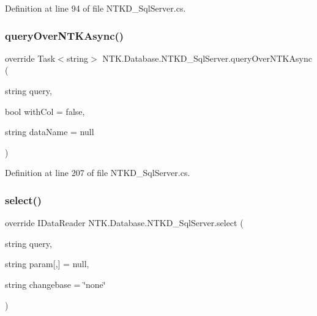 Definition at line 94 of file N\+T\+K\+D\+\_\+\+Sql\+Server.\+cs.

\mbox{\label{class_n_t_k_1_1_database_1_1_n_t_k_d___sql_server_a7c93061e063f98557311a8bb451f8598}} 
\subsubsection{\texorpdfstring{queryOverNTKAsync()}{queryOverNTKAsync()}}
{\footnotesize\ttfamily override Task$<$string$>$ N\+T\+K.\+Database.\+N\+T\+K\+D\+\_\+\+Sql\+Server.\+query\+Over\+N\+T\+K\+Async (\begin{DoxyParamCaption}\item[{string}]{query,  }\item[{bool}]{with\+Col = {\ttfamily false},  }\item[{string}]{data\+Name = {\ttfamily null} }\end{DoxyParamCaption})}



Definition at line 207 of file N\+T\+K\+D\+\_\+\+Sql\+Server.\+cs.

\mbox{\label{class_n_t_k_1_1_database_1_1_n_t_k_d___sql_server_ac78659791b01d0d3a8fbcdadf655b6a5}} 
\subsubsection{\texorpdfstring{select()}{select()}}
{\footnotesize\ttfamily override I\+Data\+Reader N\+T\+K.\+Database.\+N\+T\+K\+D\+\_\+\+Sql\+Server.\+select (\begin{DoxyParamCaption}\item[{string}]{query,  }\item[{string}]{param\mbox{[},\mbox{]} = {\ttfamily null},  }\item[{string}]{changebase = {\ttfamily \char`\"{}none\char`\"{}} }\end{DoxyParamCaption})}



